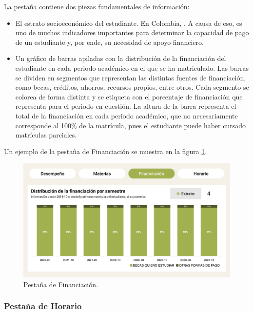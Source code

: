 La pestaña contiene dos piezas fundamentales de información:
\begin{itemize}
	\item El estrato socioeconómico del estudiante. En Colombia,  \cite{estrato}. A causa de eso, es uno de muchos indicadores importantes para determinar la capacidad de pago de un estudiante y, por ende, su necesidad de apoyo financiero.
	\item Un gráfico de barras apiladas con la distribución de la financiación del estudiante en cada periodo académico en el que se ha matriculado. Las barras se dividen en segmentos que representan las distintas fuentes de financiación, como becas, créditos, ahorros, recursos propios, entre otros. Cada segmento se colorea de forma distinta y se etiqueta con el porcentaje de financiación que representa para el periodo en cuestión. La altura de la barra representa el total de la financiación en cada periodo académico, que no necesariamente corresponde al 100\% de la matrícula, pues el estudiante puede haber cursado matrículas parciales.
\end{itemize}
Un ejemplo de la pestaña de Financiación se muestra en la figura \ref{fig:financiacion}.

\begin{figure}[H]
	\centering
	\includegraphics[width=\textwidth]{assets/nes/financiacion.png}
	\caption{Pestaña de Financiación.}
	\label{fig:financiacion}
\end{figure}

\subsubsection{Pestaña de Horario}

